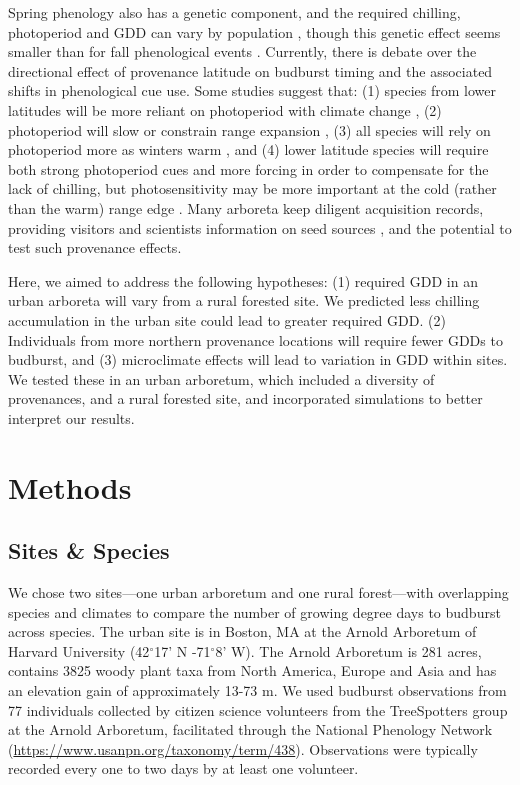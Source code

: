 \documentclass{article}\usepackage[]{graphicx}\usepackage[]{color}
\begin{document}
Spring phenology also has a genetic component, and the required chilling, photoperiod and GDD can vary by population \citep{Scotti2004,Cuervo-Alarcon2018}, though this genetic effect seems smaller than for fall phenological events \citep{McKown2013, Aitken2015, Vico2021}. Currently, there is debate over the directional effect of provenance latitude on budburst timing and the associated shifts in phenological cue use. Some studies suggest that: (1) species from lower latitudes will be more reliant on photoperiod with climate change \citep{Zohner2016}, (2) photoperiod will slow or constrain range expansion \citep{Saikkonen2012}, (3) all species will rely on photoperiod more as winters warm \citep{Way2015}, and (4) lower latitude species will require both strong photoperiod cues and more forcing in order to compensate for the lack of chilling, but photosensitivity may be more important at the cold (rather than the warm) range edge \citep{Gauzere2017}. Many arboreta keep diligent acquisition records, providing visitors and scientists information on seed sources \citep{Dosmann2006}, and the potential to test such provenance effects. 

Here, we aimed to address the following hypotheses: (1) required GDD in an urban arboreta will vary from a rural forested site. We predicted less chilling accumulation in the urban site could lead to greater required GDD. (2) Individuals from more northern provenance locations will require fewer GDDs to budburst, and (3) microclimate effects will lead to variation in GDD within sites. We tested these in an urban arboretum, which included a diversity of provenances, and a rural forested site, and incorporated simulations to better interpret our results. 

\section*{Methods}
\subsection*{Sites \& Species}
We chose two sites---one urban arboretum and one rural forest---with overlapping species and climates to compare the number of growing degree days to budburst across species. The urban site is in Boston, MA at the Arnold Arboretum of Harvard University (42$^{\circ}$17' N -71$^{\circ}$8' W). The Arnold Arboretum is 281 acres, contains 3825 woody plant taxa from North America, Europe and Asia and has an elevation gain of approximately 13-73 m. We used budburst observations \citep[i.e., defined as the `beginning of sprouting or bud breaking; shoot emergence' as BBCH scale 07][]{Finn2007} from 77 individuals collected by citizen science volunteers from the TreeSpotters group at the Arnold Arboretum, facilitated through the National Phenology Network (\url{https://www.usanpn.org/taxonomy/term/438}). Observations were typically recorded every one to two days by at least one volunteer.
\end{document}
